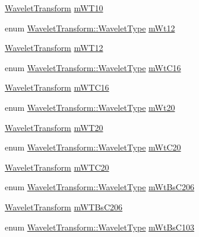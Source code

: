\begin{DoxyCompactItemize}
\item 
\hyperlink{classtsa_1_1_wavelet_transform}{Wavelet\+Transform} \hyperlink{classtsa_1_1_w_d_f2_classify_a76e2e8df164b04fd2cfdde2b7c757d8b}{m\+W\+T10}
\item 
enum \hyperlink{classtsa_1_1_wavelet_transform_a5a529de70e0004333fcf23b9cca88ce7}{Wavelet\+Transform\+::\+Wavelet\+Type} \hyperlink{classtsa_1_1_w_d_f2_classify_a680bfb1cce916b4f0c8dde32c9b5ba56}{m\+Wt12}
\item 
\hyperlink{classtsa_1_1_wavelet_transform}{Wavelet\+Transform} \hyperlink{classtsa_1_1_w_d_f2_classify_ac8e6dc4957dfa6f59ff7ccc29f2ce43d}{m\+W\+T12}
\item 
enum \hyperlink{classtsa_1_1_wavelet_transform_a5a529de70e0004333fcf23b9cca88ce7}{Wavelet\+Transform\+::\+Wavelet\+Type} \hyperlink{classtsa_1_1_w_d_f2_classify_a86fd375260ff0a37e35a907faef1aece}{m\+Wt\+C16}
\item 
\hyperlink{classtsa_1_1_wavelet_transform}{Wavelet\+Transform} \hyperlink{classtsa_1_1_w_d_f2_classify_af835a72fb26db49ef93cbd021f8e4bdb}{m\+W\+T\+C16}
\item 
enum \hyperlink{classtsa_1_1_wavelet_transform_a5a529de70e0004333fcf23b9cca88ce7}{Wavelet\+Transform\+::\+Wavelet\+Type} \hyperlink{classtsa_1_1_w_d_f2_classify_a1d1fd6a041771fb798fedf0a5cf93c0e}{m\+Wt20}
\item 
\hyperlink{classtsa_1_1_wavelet_transform}{Wavelet\+Transform} \hyperlink{classtsa_1_1_w_d_f2_classify_a1d63a00182c81bacff1db01478515ed4}{m\+W\+T20}
\item 
enum \hyperlink{classtsa_1_1_wavelet_transform_a5a529de70e0004333fcf23b9cca88ce7}{Wavelet\+Transform\+::\+Wavelet\+Type} \hyperlink{classtsa_1_1_w_d_f2_classify_ad6da16716d8395a4f1369617e21de922}{m\+Wt\+C20}
\item 
\hyperlink{classtsa_1_1_wavelet_transform}{Wavelet\+Transform} \hyperlink{classtsa_1_1_w_d_f2_classify_a89d405377ab84a4b331c426e62e547f2}{m\+W\+T\+C20}
\item 
enum \hyperlink{classtsa_1_1_wavelet_transform_a5a529de70e0004333fcf23b9cca88ce7}{Wavelet\+Transform\+::\+Wavelet\+Type} \hyperlink{classtsa_1_1_w_d_f2_classify_a65eb9f16c9a193b616dbb61a14e2ffa3}{m\+Wt\+Bs\+C206}
\item 
\hyperlink{classtsa_1_1_wavelet_transform}{Wavelet\+Transform} \hyperlink{classtsa_1_1_w_d_f2_classify_a1749a1dfb97e35df3a0eb81888e3d08a}{m\+W\+T\+Bs\+C206}
\item 
enum \hyperlink{classtsa_1_1_wavelet_transform_a5a529de70e0004333fcf23b9cca88ce7}{Wavelet\+Transform\+::\+Wavelet\+Type} \hyperlink{classtsa_1_1_w_d_f2_classify_ae58565c51462fa2453ae29550e9a1067}{m\+Wt\+Bs\+C103}

\end{DoxyCompactItemize}
